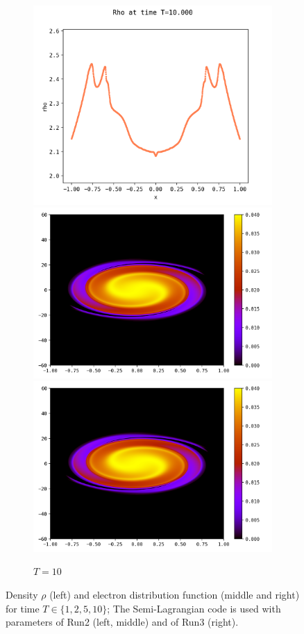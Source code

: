 \documentclass{article}
\numberwithin{equation}{section}
\newcommand{\mysubcaption}[1]{
	\vspace*{5pt}
	\begin{minipage}{0.8\linewidth}
		\begin{center}
			\footnotesize\emph{#1}
		\end{center}
	\end{minipage}
}
\newcommand{\imh}{\textheight} %
\begin{document}
\begin{figure}
	\begin{subfigure}{\textwidth}
		\centering
		\includegraphics[height=\imh,width=0.3\linewidth]{images/rhoT10.png}
		\includegraphics[height=\imh,width=0.3\linewidth]{images/feT10.png}
		\includegraphics[height=\imh,width=0.3\linewidth]{images/feT10_run_job2.png}
		\caption{$T=10$}
	\end{subfigure}


	\caption{Density $\rho$ (left) and electron distribution function (middle and right) for time $T\in \{1,2,5,10\}$; 
	 The Semi-Lagrangian code is used with parameters of Run2 (left, middle) and of Run3 (right).
	}
	\label{fig:comp_temps}
\end{figure}  
\end{document}
